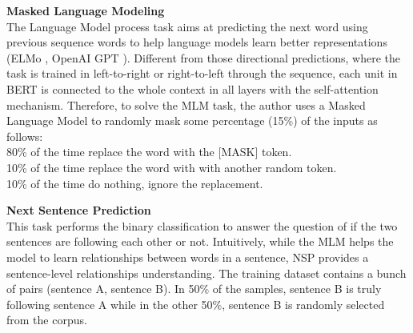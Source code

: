 \textbf{Masked Language Modeling} \\ 
The Language Model process \cite{dai2015semi} task aims at predicting the next word using previous sequence words to help language models learn better representations (ELMo \cite{peters2018deep}, OpenAI GPT \cite{radford2018improving}).
Different from those directional predictions, where the task is trained in left-to-right or right-to-left through the sequence, each unit in BERT is connected to the whole context in all layers with the self-attention mechanism. Therefore, to solve the MLM task, the author uses a Masked Language Model to randomly mask some percentage (15\%) of the inputs as follows: \\
80\% of the time replace the word with the [MASK] token. \\
10\% of the time replace the word with with another random token. \\
10\% of the time do nothing, ignore the replacement.

\textbf{Next Sentence Prediction} \\
This task performs the binary classification to answer the question of if the two sentences are following each other or not. Intuitively, while the MLM helps the model to learn relationships between words in a sentence, NSP provides a sentence-level relationships understanding. The training dataset contains a bunch of pairs (sentence A, sentence B). In 50\% of the samples, sentence B is truly following sentence A while in the other 50\%, sentence B is randomly selected from the corpus.



